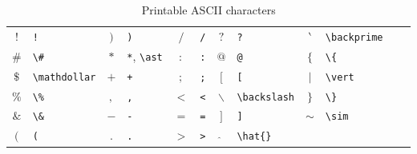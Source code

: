 \documentclass[captions=tableheading]{scrartcl}
\begin{document}
\begin{table}
  \caption{Printable \textsc{ASCII} characters}
  \label{tab:ascii}
  \centering
  \begin{tabular}[c]{cl@{\hskip 2.5em}cl@{\hskip 2.5em}cl@{\hskip 2.5em}cl@{\hskip 2.5em}cl@{\hskip 2.5em}cl}
    \toprule
    $!$ & \verb|!| & $)$ & \verb|)| & $/$ & \verb|/| & $?$ & \verb|?| &
    $\backprime$ & \verb|\backprime| \\
    $\#$ & \verb|\#| & $*$ & \verb|*|, \verb|\ast| & $:$ & \verb|:| &
    $@$ & \verb|@| & $\{$ & \verb|\{| \\
    $\mathdollar$ & \verb|\mathdollar| & $+$ & \verb|+| &
    $;$ & \verb|;| & $[$ & \verb|[| & $\vert$ & \verb|\vert| \\
    $\%$ & \verb|\%| & $,$ & \verb|,| & $<$ & \verb|<| &
    $\backslash$ & \verb|\backslash| & $\}$ & \verb|\}| \\
    $\&$ & \verb|\&| & $-$ & \verb|-| & $=$ & \verb|=| &
    $]$ & \verb|]| & $\sim$ & \verb|\sim| \\
    $($ & \verb|(| & $.$ & \verb|.| & $>$ & \verb|>| &
    $\hat{}$ & \verb|\hat{}| & & \\
    \bottomrule
  \end{tabular}
\end{table}
\end{document}
